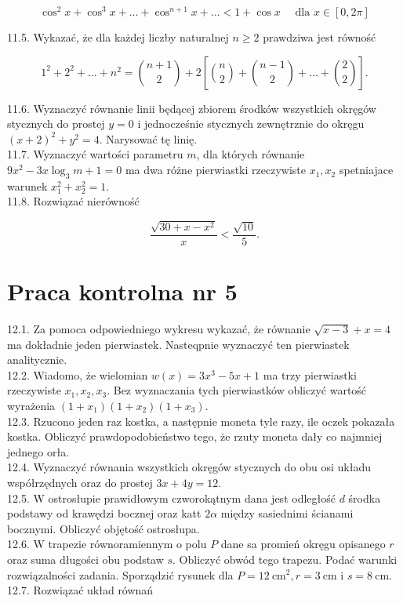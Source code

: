 \documentclass[10pt]{article}
\begin{document}
$$
\cos ^{2} x+\cos ^{3} x+\ldots+\cos ^{n+1} x+\ldots<1+\cos x \quad \text { dla } x \in[0,2 \pi]
$$

11.5. Wykazać, że dla każdej liczby naturalnej $n \geq 2$ prawdziwa jest równość

$$
1^{2}+2^{2}+\ldots+n^{2}=\binom{n+1}{2}+2\left[\binom{n}{2}+\binom{n-1}{2}+\ldots+\binom{2}{2}\right] .
$$

11.6. Wyznaczyć równanie linii będącej zbiorem środków wszystkich okręgów stycznych do prostej $y=0$ i jednocześnie stycznych zewnętrznie do okręgu $(x+2)^{2}+y^{2}=4$. Narysować tę linię.\\
11.7. Wyznaczyć wartości parametru $m$, dla których równanie $9 x^{2}-3 x \log _{3} m+1=0$ ma dwa różne pierwiastki rzeczywiste $x_{1}, x_{2}$ spetniajace warunek $x_{1}^{2}+x_{2}^{2}=1$.\\
11.8. Rozwiązać nierówność

$$
\frac{\sqrt{30+x-x^{2}}}{x}<\frac{\sqrt{10}}{5} .
$$

\section*{Praca kontrolna nr 5}
12.1. Za pomoca odpowiedniego wykresu wykazać, że równanie $\sqrt{x-3}+x=4$ ma dokładnie jeden pierwiastek. Nasteqpnie wyznaczyć ten pierwiastek analitycznie.\\
12.2. Wiadomo, że wielomian $w(x)=3 x^{3}-5 x+1$ ma trzy pierwiastki rzeczywiste $x_{1}, x_{2}, x_{3}$. Bez wyznaczania tych pierwiastków obliczyć wartość wyrażenia $\left(1+x_{1}\right)\left(1+x_{2}\right)\left(1+x_{3}\right)$.\\
12.3. Rzucono jeden raz kostka, a następnie moneta tyle razy, ile oczek pokazała kostka. Obliczyć prawdopodobieństwo tego, że rzuty moneta dały co najmniej jednego orła.\\
12.4. Wyznaczyć równania wszystkich okręgów stycznych do obu osi układu współrzędnych oraz do prostej $3 x+4 y=12$.\\
12.5. W ostrosłupie prawidłowym czworokątnym dana jest odległość $d$ środka podstawy od krawędzi bocznej oraz katt $2 \alpha$ między sasiednimi ścianami bocznymi. Obliczyć objętość ostrosłupa.\\
12.6. W trapezie równoramiennym o polu $P$ dane sa promień okręgu opisanego $r$ oraz suma długości obu podstaw $s$. Obliczyć obwód tego trapezu. Podać warunki rozwiązalności zadania. Sporządzić rysunek dla $P=12 \mathrm{~cm}^{2}, r=3 \mathrm{~cm}$ i $s=8 \mathrm{~cm}$.\\
12.7. Rozwiązać układ równań
\end{document}

